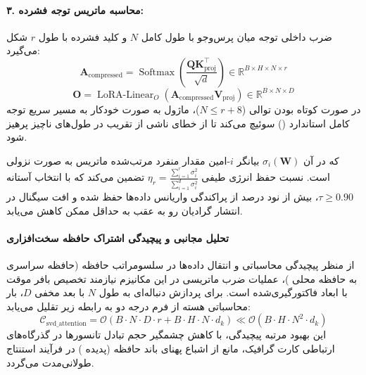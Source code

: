 \paragraph{۳. محاسبه ماتریس توجه فشرده:}
ضرب داخلی توجه میان پرس‌وجو با طول کامل $N$ و کلید فشرده با طول $r$ شکل می‌گیرد:
\begin{equation}
\mathbf{A}_{\text{compressed}} = \operatorname{Softmax}\left(\frac{\mathbf{Q} \mathbf{K}_{\text{proj}}^\top}{\sqrt{d}}\right) \in \mathbb{R}^{B \times H \times N \times r}
\end{equation}
\begin{equation}
\mathbf{O} = \operatorname{LoRA-Linear}_O\left(\mathbf{A}_{\text{compressed}} \mathbf{V}_{\text{proj}}\right) \in \mathbb{R}^{B \times N \times D}
\end{equation}
در صورت کوتاه بودن توالی ($N \le r + 8$)، ماژول به صورت خودکار به مسیر سریع توجه کامل استاندارد () سوئیچ می‌کند تا از خطای ناشی از تقریب در طول‌های ناچیز پرهیز شود.

که در آن $\sigma_i(\mathbf{W})$ بیانگر $i$-امین مقدار منفرد مرتب‌شده ماتریس به صورت نزولی است. نسبت حفظ انرژی طیفی $\eta_r = \frac{\sum_{i=1}^r \sigma_i^2}{\sum_{i=1}^{d} \sigma_i^2}$ تضمین می‌کند که با انتخاب آستانه $\tau \ge 0.90$، بیش از نود درصد از پراکندگی واریانس داده‌ها حفظ شده و افت سیگنال در انتشار گرادیان رو به عقب به حداقل ممکن کاهش می‌یابد.

\paragraph{تحلیل مجانبی و پیچیدگی اشتراک حافظه سخت‌افزاری}
از منظر پیچیدگی محاسباتی و انتقال داده‌ها در سلسومراتب حافظه (حافظه سراسری  به حافظه محلی )، عملیات ضرب ماتریسی در این مکانیزم نیازمند تخصیص بافر موقت با ابعاد فاکتورگیری‌شده است. برای پردازش دنباله‌ای به طول $N$ با بعد مخفی $D$، بار محاسباتی هسته از فرم درجه دو به رابطه زیر تقلیل می‌یابد:
\begin{equation}
\label{eq:complexity_svd_attention}
\mathcal{C}_{\text{svd\_attention}} = \mathcal{O}\left( B \cdot N \cdot D \cdot r + B \cdot H \cdot N \cdot d_k \right) \ll \mathcal{O}\left( B \cdot H \cdot N^2 \cdot d_k \right)
\end{equation}
این بهبود مرتبه پیچیدگی، با کاهش چشمگیر حجم تبادل تانسورها در گذرگاه‌های ارتباطی کارت گرافیک، مانع از اشباع پهنای باند حافظه (پدیده ) در فرآیند استنتاج طولانی‌مدت می‌گردد.

